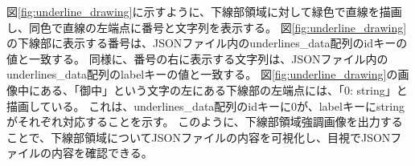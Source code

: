図\ref{fig:underline_drawing}に示すように、下線部領域に対して緑色で直線を描画し、同色で直線の左端点に番号と文字列を表示する。
図\ref{fig:underline_drawing}の下線部に表示する番号は、JSONファイル内のunderlines\_data配列のidキーの値と一致する。
同様に、番号の右に表示する文字列は、JSONファイル内のunderlines\_data配列のlabelキーの値と一致する。
図\ref{fig:underline_drawing}の画像中にある、「御中」という文字の左にある下線部の左端点には、「0: string」と描画している。
これは、underlines\_data配列のidキーに0が、labelキーにstringがそれぞれ対応することを示す。
このように、下線部領域強調画像を出力することで、下線部領域についてJSONファイルの内容を可視化し、目視でJSONファイルの内容を確認できる。

